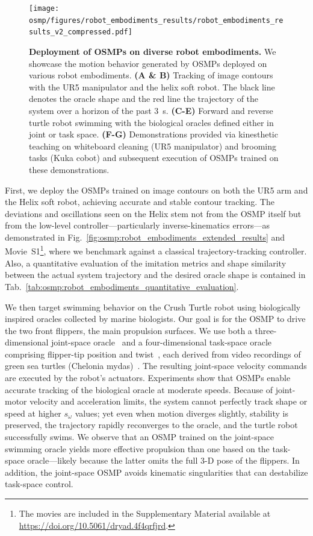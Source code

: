 \begin{figure}
    \centering
    \texttt{[image: osmp/figures/robot\_embodiments\_results/robot\_embodiments\_results\_v2\_compressed.pdf]}
    \caption{\textbf{Deployment of \glspl{OSMP} on diverse robot embodiments.}
    We showcase the motion behavior generated by \glspl{OSMP} deployed on various robot embodiments.
    \textbf{(A \& B)} Tracking of image contours with the UR5 manipulator and the helix soft robot. The black line denotes the oracle shape and the red line the trajectory of the system over a horizon of the past $3$~s.
    \textbf{(C-E)} Forward and reverse turtle robot swimming with the biological oracles defined either in joint or task space.
    \textbf{(F-G)} Demonstrations provided via kinesthetic teaching on whiteboard cleaning (UR5 manipulator) and brooming tasks (Kuka cobot) and subsequent execution of \glspl{OSMP} trained on these demonstrations.
    }
    \label{fig:osmp:robot_embodiments_results}
\end{figure}

First, we deploy the \glspl{OSMP} trained on image contours on both the UR5 arm and the Helix soft robot, achieving accurate and stable contour tracking. The deviations and oscillations seen on the Helix stem not from the \gls{OSMP} itself but from the low-level controller—particularly inverse-kinematics errors—as demonstrated in Fig.~\ref{fig:osmp:robot_embodiments_extended_results} and Movie~S1\footnote{The movies are included in the Supplementary Material available at {\tiny \url{https://doi.org/10.5061/dryad.4f4qrfjrd}}.}, where we benchmark against a classical trajectory-tracking controller.
Also, a quantitative evaluation of the imitation metrics and shape similarity between the actual system trajectory and the desired oracle shape is contained in Tab.~\ref{tab:osmp:robot_embodiments_quantitative_evaluation}.

We then target swimming behavior on the Crush Turtle robot using biologically inspired oracles collected by marine biologists. Our goal is for the \gls{OSMP} to drive the two front flippers, the main propulsion surfaces. We use both a three-dimensional joint-space oracle~\citep{van2023soft} and a four-dimensional task-space oracle comprising flipper-tip position and twist~\citep{van2022new}, each derived from video recordings of green sea turtles (Chelonia mydas)~\citep{van2022new,van2023soft}. The resulting joint-space velocity commands are executed by the robot’s actuators. Experiments show that \glspl{OSMP} enable accurate tracking of the biological oracle at moderate speeds. Because of joint-motor velocity and acceleration limits, the system cannot perfectly track shape or speed at higher $s_\omega$ values; yet even when motion diverges slightly, stability is preserved, the trajectory rapidly reconverges to the oracle, and the turtle robot successfully swims. 
We observe that an \gls{OSMP} trained on the joint-space swimming oracle yields more effective propulsion than one based on the task-space oracle—likely because the latter omits the full 3-D pose of the flippers. In addition, the joint-space \gls{OSMP} avoids kinematic singularities that can destabilize task-space control.

